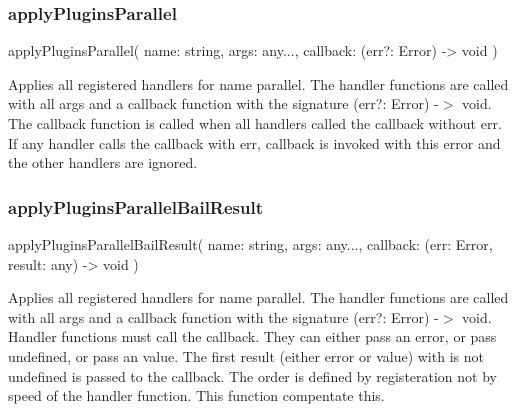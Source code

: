 \subsubsection*{apply\+Plugins\+Parallel}


\begin{DoxyCode}
applyPluginsParallel(
    name: string,
    args: any...,
    callback: (err?: Error) -> void
)
\end{DoxyCode}


Applies all registered handlers for {\ttfamily name} parallel. The handler functions are called with all args and a callback function with the signature {\ttfamily (err?\+: Error) -\/$>$ void}. The {\ttfamily callback} function is called when all handlers called the callback without {\ttfamily err}. If any handler calls the callback with {\ttfamily err}, {\ttfamily callback} is invoked with this error and the other handlers are ignored.

\subsubsection*{apply\+Plugins\+Parallel\+Bail\+Result}


\begin{DoxyCode}
applyPluginsParallelBailResult(
    name: string,
    args: any...,
    callback: (err: Error, result: any) -> void
)
\end{DoxyCode}


Applies all registered handlers for {\ttfamily name} parallel. The handler functions are called with all args and a callback function with the signature {\ttfamily (err?\+: Error) -\/$>$ void}. Handler functions must call the callback. They can either pass an error, or pass undefined, or pass an value. The first result (either error or value) with is not undefined is passed to the {\ttfamily callback}. The order is defined by registeration not by speed of the handler function. This function compentate this. 